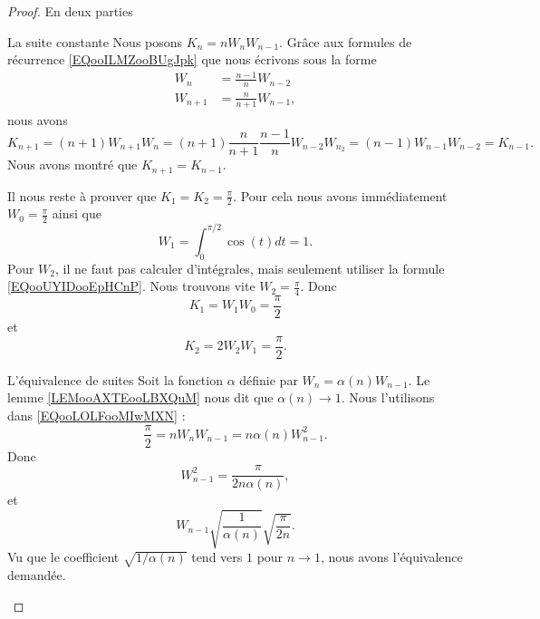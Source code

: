 \begin{proof}
	En deux parties
	\begin{subproof}
		\item[La suite constante]
		Nous posons \( K_n=nW_nW_{n-1}\). Grâce aux formules de récurrence \eqref{EQooILMZooBUgJpk} que nous écrivons sous la forme
		\begin{subequations}
			\begin{align}
				W_n     & =\frac{ n-1 }{ n }W_{n-2}  \\
				W_{n+1} & =\frac{ n }{ n+1 }W_{n-1},
			\end{align}
		\end{subequations}
		nous avons
		\begin{equation}
			K_{n+1}=(n+1)W_{n+1}W_n=(n+1)\frac{ n }{ n+1 }\frac{ n-1 }{ n }W_{n-2}W_{n_2}=(n-1)W_{n-1}W_{n-2}=K_{n-1}.
		\end{equation}
		Nous avons montré que \( K_{n+1}=K_{n-1}\).

		Il nous reste à prouver que \( K_1=K_2=\frac{ \pi }{2}\). Pour cela nous avons immédiatement \( W_0=\frac{ \pi }{2}\) ainsi que
		\begin{equation}
			W_1=\int_0^{\pi/2}\cos(t)dt=1.
		\end{equation}
		Pour \( W_2\), il ne faut pas calculer d'intégrales, mais seulement utiliser la formule \eqref{EQooUYIDooEpHCnP}. Nous trouvons vite \( W_2=\frac{ \pi }{ 4 }\). Donc
		\begin{equation}
			K_1=W_1W_0=\frac{ \pi }{2}
		\end{equation}
		et
		\begin{equation}
			K_2=2W_2W_1=\frac{ \pi }{2}.
		\end{equation}
		\item[L'équivalence de suites]
		Soit la fonction \( \alpha\)  définie par \( W_n=\alpha(n)W_{n-1}\). Le lemme \ref{LEMooAXTEooLBXQuM} nous dit que \( \alpha(n)\to 1\). Nous l'utilisons dans \eqref{EQooLOLFooMIwMXN} :
		\begin{equation}
			\frac{ \pi }{2}=nW_nW_{n-1}=n\alpha(n)W_{n-1}^2.
		\end{equation}
		Donc
		\begin{equation}
			W_{n-1}^2=\frac{ \pi }{ 2n\alpha(n) },
		\end{equation}
		et
		\begin{equation}
			W_{n-1}\sqrt{ \frac{1}{ \alpha(n) } }\sqrt{ \frac{ \pi }{ 2n } }.
		\end{equation}
		Vu que le coefficient \( \sqrt{ 1/\alpha(n) }\) tend vers \( 1\) pour \( n\to 1\), nous avons l'équivalence demandée.
	\end{subproof}
\end{proof}

